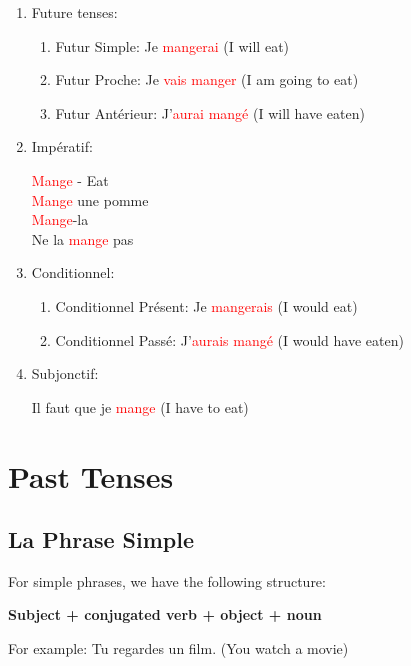 \documentclass{book}
\begin{document}
\begin{enumerate}
        \item Future tenses:
            \begin{enumerate}
                \item Futur Simple: Je \textcolor{red}{mangerai} (I will eat)
                \item Futur Proche: Je \textcolor{red}{vais manger} (I am going to eat)
                \item Futur Antérieur: J'\textcolor{red}{aurai mangé} (I will have eaten)
            \end{enumerate}

        \item Impératif:
            \begin{center}
                \textcolor{red}{Mange} - Eat \\
                \textcolor{red}{Mange} une pomme \\
                \textcolor{red}{Mange}-la \\
                Ne la \textcolor{red}{mange} pas
            \end{center}

        \item Conditionnel:
            \begin{enumerate}
                \item Conditionnel Présent: Je \textcolor{red}{mangerais} (I would eat)
                \item Conditionnel Passé: J'\textcolor{red}{aurais mangé} (I would have eaten)
            \end{enumerate}

        \item Subjonctif:
            \begin{center}
                Il faut que je \textcolor{red}{mange} (I have to eat)
            \end{center}
    \end{enumerate}


\chapter{Past Tenses}

\section{La Phrase Simple}
For simple phrases, we have the following structure:
\begin{center}
    \textbf{Subject + conjugated verb + object + noun}
\end{center}
For example: Tu regardes un film. (You watch a movie)
\end{document}

